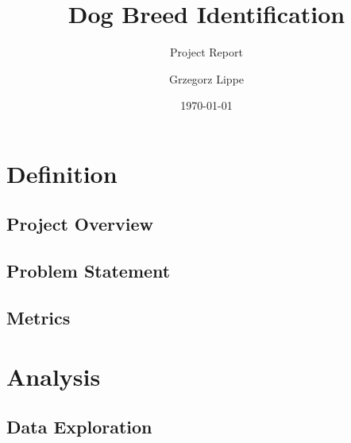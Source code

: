 \documentclass[paper=A4, DIV=calc, parskip=half]{scrartcl}
\title{Dog Breed Identification}
\subtitle{Project Report}
\author{Grzegorz Lippe}
\date{\today}
\begin{document}
\maketitle

\section*{Definition}

\subsection*{Project Overview}


\subsection*{Problem Statement}


\subsection*{Metrics}


\section*{Analysis}

\subsection*{Data Exploration}

\end{document}
